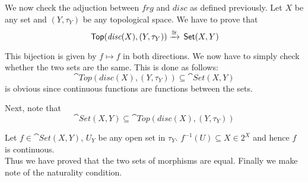 \begin{frame}

    \begin{center}
    \end{center}
    
We now check the adjuction between \(frg\) and \(disc\) as  defined previously.
Let \(X \) be any set and \((Y,\tau_Y)\) be any topological space. We have to
prove that 
\begin{equation}
    \,\textsf{Top}(\textit{disc}(X) , (Y, \tau_Y)  ) \xrightarrow{\cong} \,\textsf{Set}(X, Y)
\end{equation}

\pause

This bijection is given by  \(f \mapsto f \) in both directions. We now have to
simply check whether the two sets are the same. This is done as follows: 
\begin{equation}
    \cat{Top}(\textit{disc}(X) , (Y, \tau_Y)  ) \subseteq \cat{Set}(X, Y)
\end{equation}
is obvious since continuous functions are functions between the sets. 
\end{frame}
\begin{frame}
    
Next, note that 
\begin{equation}
    \cat{Set}(X, Y) \subseteq \cat{Top}(\textit{disc}(X) , (Y, \tau_Y)  )
\end{equation}

    Let \(f \in \cat{Set}(X,Y)\),  \(U_Y\) be any open set in \(\tau_Y\).
    \(f^{-1}(U) \subseteq X \in 2^X\) and hence \(f\) is continuous. \\
    Thus we have proved that the two sets of morphisms are equal. Finally we make note of the
    naturality condition. 
\end{frame}
